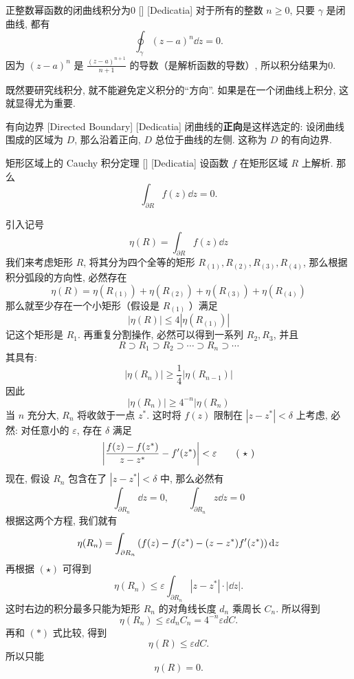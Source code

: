         \begin{xmp}
            {正整数幂函数的闭曲线积分为0}
            []
            [Dedicatia]
            对于所有的整数 \(n\geqslant 0\), 只要 \(\gamma\) 是闭曲线, 都有
            \[\oint_\gamma (z-a)^n\dd{z}=0.\]
            因为 \((z-a)^n\) 是 \(\frac{(z-a)^{n+1}}{n+1}\) 的导数（是解析函数的导数）, 所以积分结果为0. 
        \end{xmp}

        既然要研究线积分, 就不能避免定义积分的“方向”. 如果是在一个闭曲线上积分, 这就显得尤为重要. 

        \begin{dfn}
            {有向边界}
            [Directed Boundary]
            [Dedicatia]
            闭曲线的\textbf{正向}是这样选定的: 设闭曲线围成的区域为 \(D\), 那么沿着正向,  \(D\) 总位于曲线的左侧. 这称为 \(D\) 的有向边界. 
        \end{dfn}

        \begin{thm}
            {矩形区域上的 Cauchy 积分定理}
            []
            [Dedicatia]
            设函数 \(f\) 在矩形区域 \(R\) 上解析. 那么
            \[\int_{\partial R}f(z)\dd{z}=0.\]
        \end{thm}

        \begin{prf}
            引入记号
            \[\eta(R)=\int_{\partial R}f(z)\dd{z}\]
            我们来考虑矩形 \(R\), 将其分为四个全等的矩形 \(R_{(1)}, R_{(2)}, R_{(3)}, R_{(4)}\), 那么根据积分弧段的方向性, 必然存在
            \[\eta(R)=\eta(R_{(1)})+\eta(R_{(2)})+\eta(R_{(3)})+\eta(R_{(4)})\]
            那么就至少存在一个小矩形（假设是 \(R_{(1)}\) ）满足
            \[|\eta(R)|\leqslant 4|\eta(R_{(1)})|\]
            记这个矩形是 \(R_1\). 再重复分割操作, 必然可以得到一系列 \(R_2, R_3\), 并且
            \[R\supset R_1\supset R_2\supset\cdots\supset R_n\supset\cdots\]
            其具有: 
            \[|\eta(R_n)|\geqslant \frac{1}{4}|\eta(R_{n-1})|\]
            因此
            \[|\eta(R_n)|\geqslant 4^{-n}|\eta(R_n)\tag{ \(\ast\) }\]
            当 \(n\) 充分大,  \(R_n\) 将收敛于一点 \(z^*\). 这时将 \(f(z)\) 限制在 \(|z-z^*|<\delta \) 上考虑, 必然: 对任意小的 \(\varepsilon\), 存在 \(\delta\) 满足
            \[\vqty{\frac{f(z)-f(z^*)}{z-z^*}-f'(z^*)}<\varepsilon\tag{ \(\star\) }\]
            现在, 假设 \(R_n\) 包含在了 \(|z-z^*|<\delta\) 中, 那么必然有
            \[\int_{\partial R_n}\dd{z}=0,\qquad\int_{\partial R_n}z\dd{z}=0\]
            根据这两个方程, 我们就有
            \[\eta(R_n)=\int_{\partial R_n}\pqty{f(z)-f(z^*)-(z-z^*)f'(z^*)}\dd{z}\]
            再根据 \((\star)\) 可得到
            \[\eta(R_n)\leqslant\varepsilon\int_{\partial R_n}|z-z^*|\cdot|\dd z|. \]
            这时右边的积分最多只能为矩形 \(R_n\) 的对角线长度 \(d_n\) 乘周长 \(C_n\). 所以得到
            \[\eta(R_n)\leqslant\varepsilon d_nC_n=4^{-n}\varepsilon dC.\]
            再和 \((\ast)\) 式比较, 得到
            \[\eta(R)\leqslant\varepsilon dC.\]
            所以只能
            \[\eta(R)=0.\]
        \end{prf}


